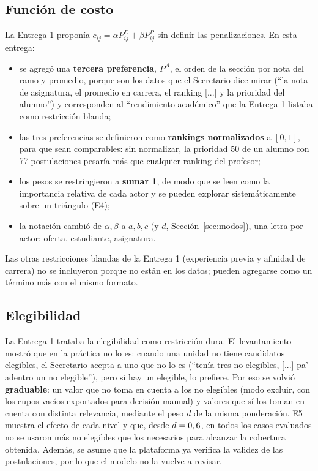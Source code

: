 \documentclass{article}
\begin{document}
\subsection{Función de costo}
La Entrega 1 proponía $c_{ij} = \alpha P^E_{ij} + \beta P^P_{ij}$ sin definir las penalizaciones. En esta entrega:
\begin{itemize}
    \item se agregó una \textbf{tercera preferencia}, $P^A$, el orden de la sección por nota del ramo y promedio, porque son los datos que el Secretario dice mirar (``la nota de asignatura, el promedio en carrera, el ranking [...] y la prioridad del alumno'') y corresponden al ``rendimiento académico'' que la Entrega 1 listaba como restricción blanda;
    \item las tres preferencias se definieron como \textbf{rankings normalizados} a $[0, 1]$, para que sean comparables: sin normalizar, la prioridad 50 de un alumno con 77 postulaciones pesaría más que cualquier ranking del profesor;
    \item los pesos se restringieron a \textbf{sumar 1}, de modo que se leen como la importancia relativa de cada actor y se pueden explorar sistemáticamente sobre un triángulo (E4);
    \item la notación cambió de $\alpha, \beta$ a $a, b, c$ (y $d$, Sección~\ref{sec:modos}), una letra por actor: oferta, estudiante, asignatura.
\end{itemize}
Las otras restricciones blandas de la Entrega 1 (experiencia previa y afinidad de carrera) no se incluyeron porque no están en los datos; pueden agregarse como un término más con el mismo formato.

\subsection{Elegibilidad}
La Entrega 1 trataba la elegibilidad como restricción dura. El levantamiento mostró que en la práctica no lo es: cuando una unidad no tiene candidatos elegibles, el Secretario acepta a uno que no lo es (``tenía tres no elegibles, [...] pa' adentro un no elegible''), pero si hay un elegible, lo prefiere. Por eso se volvió \textbf{graduable}: un valor que no toma en cuenta a los no elegibles (modo excluir, con los cupos vacíos exportados para decisión manual) y valores que sí los toman en cuenta con distinta relevancia, mediante el peso $d$ de la misma ponderación. E5 muestra el efecto de cada nivel y que, desde $d = 0,6$, en todos los casos evaluados no se usaron más no elegibles que los necesarios para alcanzar la cobertura obtenida. Además, se asume que la plataforma ya verifica la validez de las postulaciones, por lo que el modelo no la vuelve a revisar.
\end{document}
